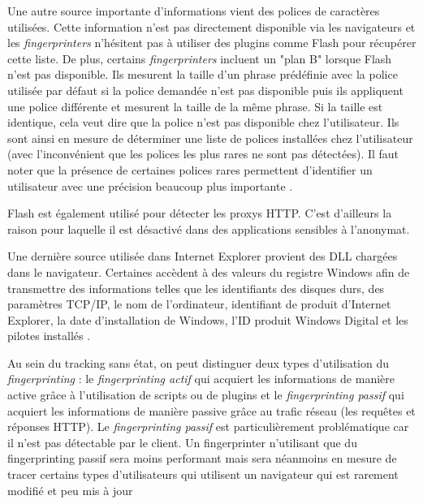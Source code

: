 Une autre source importante d'informations vient des polices de caractères utilisées. Cette information n'est pas directement disponible via les navigateurs et les \textit{fingerprinters} n'hésitent pas à utiliser des plugins comme Flash pour récupérer cette liste. De plus, certains \textit{fingerprinters} incluent un "plan B" lorsque Flash n'est pas disponible. Ils mesurent la taille d'un phrase prédéfinie avec la police utilisée par défaut si la police demandée n'est pas disponible puis ils appliquent une police différente et mesurent la taille de la même phrase. Si la taille est identique, cela veut dire que la police n'est pas disponible chez l'utilisateur. Ils sont ainsi en mesure de déterminer une liste de polices installées chez l'utilisateur (avec l'inconvénient que les polices les plus rares ne sont pas détectées). Il faut noter que la présence de certaines polices rares permettent d'identifier un utilisateur avec une précision beaucoup plus importante \cite{Boda:2011:UTW:2341491.2341497}.

Flash est également utilisé pour détecter les proxys HTTP. C'est d'ailleurs la raison pour laquelle il est désactivé dans des applications sensibles à l'anonymat.

Une dernière source utilisée dans Internet Explorer provient des DLL chargées dans le navigateur. Certaines accèdent à des valeurs du registre Windows afin de transmettre des informations telles que les identifiants des disques durs, des paramètres TCP/IP, le nom de l'ordinateur, identifiant de produit d'Internet Explorer, la date d'installation de Windows, l'ID produit Windows Digital et les pilotes installés \cite{Nikiforakis:2013:CME:2497621.2498133}.
\newline

Au sein du tracking sans état, on peut distinguer deux types d'utilisation du \textit{fingerprinting} : le \textit{fingerprinting actif} qui acquiert les informations de manière active grâce à l'utilisation de scripts ou de plugins et le \textit{fingerprinting passif} qui acquiert les informations de manière passive grâce au trafic réseau (les requêtes et réponses HTTP).
Le \textit{fingerprinting passif} est particulièrement problématique car il n'est pas détectable par le client. Un fingerprinter n'utilisant que du fingerprinting passif sera moins performant mais sera néanmoins en mesure de tracer certains types d'utilisateurs qui utilisent un navigateur qui est rarement modifié et peu mis à jour
\newline

